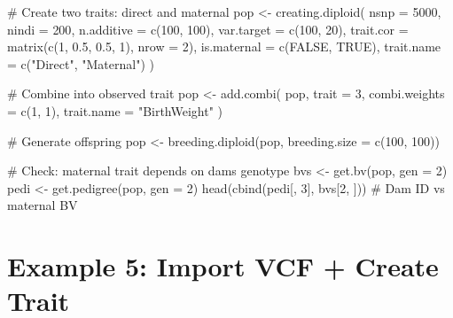 \documentclass[
  letterpaper,
]{book}
\newenvironment{Shaded}{\begin{snugshade}}{\end{snugshade}}
\newcommand{\AttributeTok}[1]{\textcolor[rgb]{0.40,0.45,0.13}{#1}}
\newcommand{\CommentTok}[1]{\textcolor[rgb]{0.37,0.37,0.37}{#1}}
\newcommand{\ConstantTok}[1]{\textcolor[rgb]{0.56,0.35,0.01}{#1}}
\newcommand{\DecValTok}[1]{\textcolor[rgb]{0.68,0.00,0.00}{#1}}
\newcommand{\FloatTok}[1]{\textcolor[rgb]{0.68,0.00,0.00}{#1}}
\newcommand{\FunctionTok}[1]{\textcolor[rgb]{0.28,0.35,0.67}{#1}}
\newcommand{\NormalTok}[1]{\textcolor[rgb]{0.00,0.23,0.31}{#1}}
\newcommand{\OtherTok}[1]{\textcolor[rgb]{0.00,0.23,0.31}{#1}}
\newcommand{\StringTok}[1]{\textcolor[rgb]{0.13,0.47,0.30}{#1}}
\begin{document}
\begin{Shaded}
\begin{Highlighting}[]
\CommentTok{\# Create two traits: direct and maternal}
\NormalTok{pop }\OtherTok{\textless{}{-}} \FunctionTok{creating.diploid}\NormalTok{(}
  \AttributeTok{nsnp =} \DecValTok{5000}\NormalTok{,}
  \AttributeTok{nindi =} \DecValTok{200}\NormalTok{,}
  \AttributeTok{n.additive =} \FunctionTok{c}\NormalTok{(}\DecValTok{100}\NormalTok{, }\DecValTok{100}\NormalTok{),}
  \AttributeTok{var.target =} \FunctionTok{c}\NormalTok{(}\DecValTok{100}\NormalTok{, }\DecValTok{20}\NormalTok{),}
  \AttributeTok{trait.cor =} \FunctionTok{matrix}\NormalTok{(}\FunctionTok{c}\NormalTok{(}\DecValTok{1}\NormalTok{, }\FloatTok{0.5}\NormalTok{, }\FloatTok{0.5}\NormalTok{, }\DecValTok{1}\NormalTok{), }\AttributeTok{nrow =} \DecValTok{2}\NormalTok{),}
  \AttributeTok{is.maternal =} \FunctionTok{c}\NormalTok{(}\ConstantTok{FALSE}\NormalTok{, }\ConstantTok{TRUE}\NormalTok{),}
  \AttributeTok{trait.name =} \FunctionTok{c}\NormalTok{(}\StringTok{"Direct"}\NormalTok{, }\StringTok{"Maternal"}\NormalTok{)}
\NormalTok{)}

\CommentTok{\# Combine into observed trait}
\NormalTok{pop }\OtherTok{\textless{}{-}} \FunctionTok{add.combi}\NormalTok{(}
\NormalTok{  pop,}
  \AttributeTok{trait =} \DecValTok{3}\NormalTok{,}
  \AttributeTok{combi.weights =} \FunctionTok{c}\NormalTok{(}\DecValTok{1}\NormalTok{, }\DecValTok{1}\NormalTok{),}
  \AttributeTok{trait.name =} \StringTok{"BirthWeight"}
\NormalTok{)}

\CommentTok{\# Generate offspring}
\NormalTok{pop }\OtherTok{\textless{}{-}} \FunctionTok{breeding.diploid}\NormalTok{(pop, }\AttributeTok{breeding.size =} \FunctionTok{c}\NormalTok{(}\DecValTok{100}\NormalTok{, }\DecValTok{100}\NormalTok{))}

\CommentTok{\# Check: maternal trait depends on dam\textquotesingle{}s genotype}
\NormalTok{bvs }\OtherTok{\textless{}{-}} \FunctionTok{get.bv}\NormalTok{(pop, }\AttributeTok{gen =} \DecValTok{2}\NormalTok{)}
\NormalTok{pedi }\OtherTok{\textless{}{-}} \FunctionTok{get.pedigree}\NormalTok{(pop, }\AttributeTok{gen =} \DecValTok{2}\NormalTok{)}
\FunctionTok{head}\NormalTok{(}\FunctionTok{cbind}\NormalTok{(pedi[, }\DecValTok{3}\NormalTok{], bvs[}\DecValTok{2}\NormalTok{, ]))  }\CommentTok{\# Dam ID vs maternal BV}
\end{Highlighting}
\end{Shaded}

\section{Example 5: Import VCF + Create
Trait}\label{sec-example-vcf-import}
\end{document}
